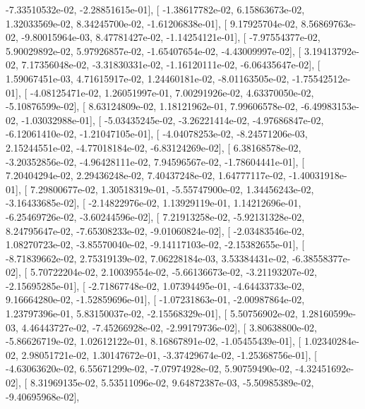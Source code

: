 \documentclass{article}
\begin{document}
         -7.33510532e-02,  -2.28851615e-01],
       [ -1.38617782e-02,   6.15863673e-02,   1.32033569e-02,
          8.34245700e-02,  -1.61206838e-01],
       [  9.17925704e-02,   8.56869763e-02,  -9.80015964e-03,
          8.47781427e-02,  -1.14254121e-01],
       [ -7.97554377e-02,   5.90029892e-02,   5.97926857e-02,
         -1.65407654e-02,  -4.43009997e-02],
       [  3.19413792e-02,   7.17356048e-02,  -3.31830331e-02,
         -1.16120111e-02,  -6.06435647e-02],
       [  1.59067451e-03,   4.71615917e-02,   1.24460181e-02,
         -8.01163505e-02,  -1.75542512e-01],
       [ -4.08125471e-02,   1.26051997e-01,   7.00291926e-02,
          4.63370050e-02,  -5.10876599e-02],
       [  8.63124809e-02,   1.18121962e-01,   7.99606578e-02,
         -6.49983153e-02,  -1.03032988e-01],
       [ -5.03435245e-02,  -3.26221414e-02,  -4.97686847e-02,
         -6.12061410e-02,  -1.21047105e-01],
       [ -4.04078253e-02,  -8.24571206e-03,   2.15244551e-02,
         -4.77018184e-02,  -6.83124269e-02],
       [  6.38168578e-02,  -3.20352856e-02,  -4.96428111e-02,
          7.94596567e-02,  -1.78604441e-01],
       [  7.20404294e-02,   2.29436248e-02,   7.40437248e-02,
          1.64777117e-02,  -1.40031918e-01],
       [  7.29800677e-02,   1.30518319e-01,  -5.55747900e-02,
          1.34456243e-02,  -3.16433685e-02],
       [ -2.14822976e-02,   1.13929119e-01,   1.14212696e-01,
         -6.25469726e-02,  -3.60244596e-02],
       [  7.21913258e-02,  -5.92131328e-02,   8.24795647e-02,
         -7.65308233e-02,  -9.01060824e-02],
       [ -2.03483546e-02,   1.08270723e-02,  -3.85570040e-02,
         -9.14117103e-02,  -2.15382655e-01],
       [ -8.71839662e-02,   2.75319139e-02,   7.06228184e-03,
          3.53384431e-02,  -6.38558377e-02],
       [  5.70722204e-02,   2.10039554e-02,  -5.66136673e-02,
         -3.21193207e-02,  -2.15695285e-01],
       [ -2.71867748e-02,   1.07394495e-01,  -4.64433733e-02,
          9.16664280e-02,  -1.52859696e-01],
       [ -1.07231863e-01,  -2.00987864e-02,   1.23797396e-01,
          5.83150037e-02,  -2.15568329e-01],
       [  5.50756902e-02,   1.28160599e-03,   4.46443727e-02,
         -7.45266928e-02,  -2.99179736e-02],
       [  3.80638800e-02,  -5.86626719e-02,   1.02612122e-01,
          8.16867891e-02,  -1.05455439e-01],
       [  1.02340284e-02,   2.98051721e-02,   1.30147672e-01,
         -3.37429674e-02,  -1.25368756e-01],
       [ -4.63063620e-02,   6.55671299e-02,  -7.07974928e-02,
          5.90759490e-02,  -4.32451692e-02],
       [  8.31969135e-02,   5.53511096e-02,   9.64872387e-03,
         -5.50985389e-02,  -9.40695968e-02],
\end{document}
